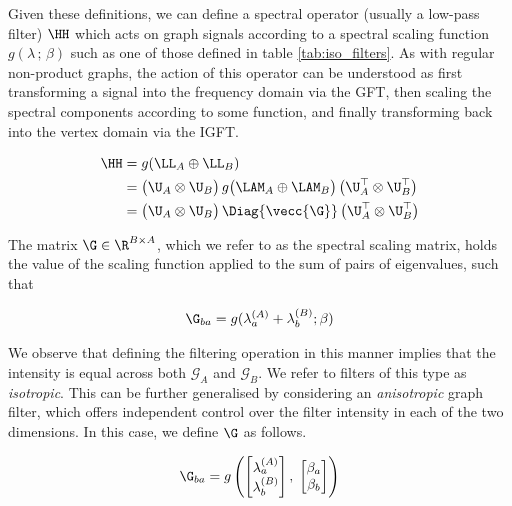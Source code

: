 Given these definitions, we can define a spectral operator (usually a low-pass filter) $\HH$ which acts on graph signals according to a spectral scaling function $g(\lambda \,; \, \beta)$ such as one of those defined in table \ref{tab:iso_filters}. As with regular non-product graphs, the action of this operator can be understood as first transforming a signal into the frequency domain via the GFT, then scaling the spectral components according to some function, and finally transforming back into the vertex domain via the IGFT.

\begin{align}
    \label{eq:graph_filter}
    \HH & = g(\LL_A \oplus \LL_B) \notag                                                                                          \\
        & = \big( \U_A \otimes \U_B \big) \, g \big( \LAM_A \oplus \LAM_B \big) \, \big( \U_A^\top \otimes \U_B^\top \big) \notag \\
        & = \big( \U_A \otimes \U_B \big) \, \Diag{\vecc{\G}} \, \big( \U_A^\top \otimes \U_B^\top \big)
\end{align}


The matrix $\G \in \R^{B \times A}$, which we refer to as the spectral scaling matrix, holds the value of the scaling function applied to the sum of
pairs of eigenvalues, such that

\begin{equation}
    \G_{ba} = g(\lambda^{(A)}_a + \lambda^{(B)}_b; \beta)
\end{equation}



We observe that defining the filtering operation in this manner implies that the intensity is equal across both $\mathcal{G}_A$ and $\mathcal{G}_B$. We refer to filters of this type as \textit{isotropic}. This can be further generalised by considering an \textit{anisotropic} graph filter, which offers independent control over the filter intensity in each of the two dimensions. In this case, we define $\G$ as follows.

\begin{equation}
    \G_{ba} =  g \left( \begin{bmatrix}
            \lambda^{(A)}_a \\ \lambda^{(B)}_b
        \end{bmatrix}, \; \begin{bmatrix}
            \beta_a \\ \beta_b
        \end{bmatrix} \right)
\end{equation}

